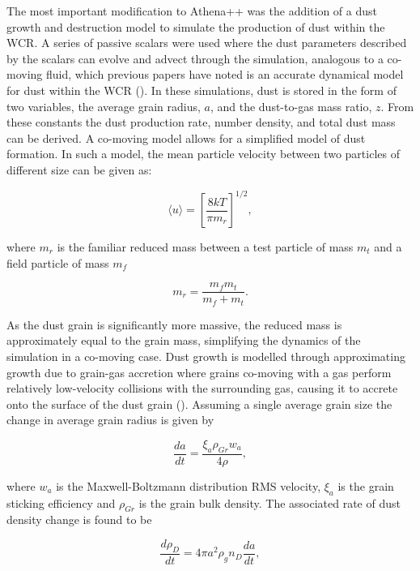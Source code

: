 \documentclass[fleqn,usenatbib]{mnras}
\begin{document}
The most important modification to Athena++ was the addition of a dust growth and destruction model to simulate the production of dust within the WCR.
A series of passive scalars were used where the dust parameters described by the scalars can evolve and advect through the simulation, analogous to a co-moving fluid, which previous papers have noted is an accurate dynamical model for dust within the WCR (\cite{hendrix_pinwheels_2016}).
In these simulations, dust is stored in the form of two variables, the average grain radius, $a$, and the dust-to-gas mass ratio, $z$.
From these constants the dust production rate, number density, and total dust mass can be derived.
A co-moving model allows for a simplified model of dust formation. In such a model, the mean particle velocity between two particles of different size can be given as:

\begin{equation}
  \langle u \rangle = \left[ \frac{8kT}{\pi m_r} \right] ^{1/2} ,
\end{equation}

\noindent
where $m_r$ is the familiar reduced mass between a test particle of mass $m_t$ and a field particle of mass $m_f$

\begin{equation}
  m_r = \frac{m_f m_t}{m_f + m_t} .
\end{equation}

\noindent
As the dust grain is significantly more massive, the reduced mass is approximately equal to the grain mass, simplifying the dynamics of the simulation in a co-moving case.
Dust growth is modelled through approximating growth due to grain-gas accretion where grains co-moving with a gas perform relatively low-velocity collisions with the surrounding gas, causing it to accrete onto the surface of the dust grain (\cite{spitzer_jr._physical_2008}).
Assuming a single average grain size the change in average grain radius is given by

\begin{equation}
  \frac{da}{dt} = \frac{\xi_a \rho_{Gr} w_a}{4 \rho} ,
\end{equation}

\noindent
where $w_a$ is the Maxwell-Boltzmann distribution RMS velocity, $\xi_a$ is the grain sticking efficiency and $\rho_{Gr}$ is the grain bulk density.
The associated rate of dust density change is found to be

\begin{equation}
  \frac{d\rho_D}{dt}  = 4 \pi a^2 \rho_g n_D \frac{da}{dt} , 
\end{equation}
\end{document}
